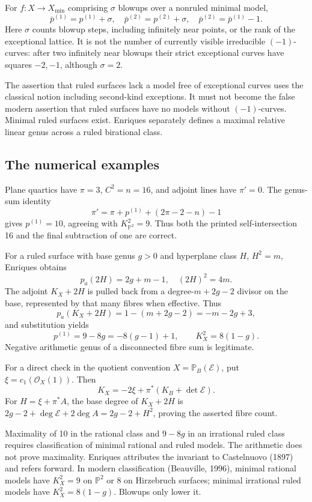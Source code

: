 For \(f:X\to X_{\min}\) comprising \(\sigma\) blowups over a nonruled minimal model, \[
\bar p^{(1)}=p^{(1)}+\sigma,\quad
\bar p^{(2)}=p^{(2)}+\sigma,\quad
\bar p^{(2)}=\bar p^{(1)}-1.
\] Here \(\sigma\) counts blowup steps, including infinitely near points, or the rank of the exceptional lattice. It is not the number of currently visible irreducible \((-1)\)-curves: after two infinitely near blowups their strict exceptional curves have squares \(-2,-1\), although \(\sigma=2\).

The assertion that ruled surfaces lack a model free of exceptional curves uses the classical notion including second-kind exceptions. It must not become the false modern assertion that ruled surfaces have no models without \((-1)\)-curves. Minimal ruled surfaces exist. Enriques separately defines a maximal relative linear genus across a ruled birational class.

\subsection{The numerical examples}

Plane quartics have \(\pi=3\), \(C^2=n=16\), and adjoint lines have \(\pi'=0\). The genus-sum identity \[
\pi'=\pi+p^{(1)}+(2\pi-2-n)-1
\] gives \(p^{(1)}=10\), agreeing with \(K_{\mathbb{P}^2}^2=9\). Thus both the printed self-intersection 16 and the final subtraction of one are correct.

For a ruled surface with base genus \(g>0\) and hyperplane class \(H\), \(H^2=m\), Enriques obtains \[
p_a(2H)=2g+m-1,\quad (2H)^2=4m.
\] The adjoint \(K_X+2H\) is pulled back from a degree-\(m+2g-2\) divisor on the base, represented by that many fibres when effective. Thus \[
p_a(K_X+2H)=1-(m+2g-2)=-m-2g+3,
\] and substitution yields \[
p^{(1)}=9-8g=-8(g-1)+1,\qquad K_X^2=8(1-g).
\] Negative arithmetic genus of a disconnected fibre sum is legitimate.

For a direct check in the quotient convention \(X=\mathbb{P}_B(\mathcal E)\), put \(\xi=c_1(\mathcal O_X(1))\). Then \[
K_X=-2\xi+\pi^*(K_B+\det\mathcal E).
\] For \(H=\xi+\pi^*A\), the base degree of \(K_X+2H\) is \(2g-2+\deg\mathcal E+2\deg A=2g-2+H^2\), proving the asserted fibre count.

Maximality of 10 in the rational class and \(9-8g\) in an irrational ruled class requires classification of minimal rational and ruled models. The arithmetic does not prove maximality. Enriques attributes the invariant to Castelnuovo (1897) and refers forward. In modern classification (Beauville, 1996), minimal rational models have \(K_X^2=9\) on \(\mathbb{P}^2\) or \(8\) on Hirzebruch surfaces; minimal irrational ruled models have \(K_X^2=8(1-g)\). Blowups only lower it.

